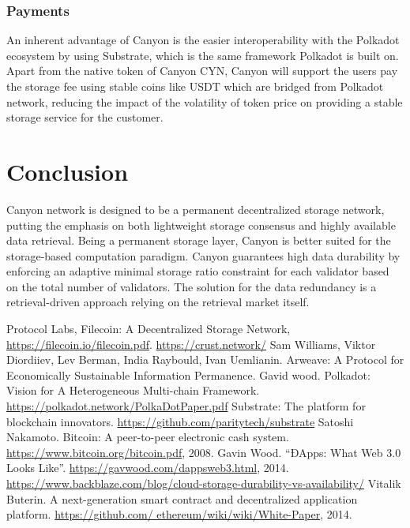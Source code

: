 \documentclass[]{article}
\begin{document}
\subsubsection{Payments}

An inherent advantage of Canyon is the easier interoperability with the Polkadot\cite{polkadot} ecosystem by using Substrate\cite{substrate}, which is the same framework Polkadot is built on. Apart from the native token of Canyon CYN, Canyon will support the users pay the storage fee using stable coins like USDT which are bridged from Polkadot network, reducing the impact of the volatility of token price on providing a stable storage service for the customer.

\section{Conclusion}

Canyon network is designed to be a permanent decentralized storage network, putting the emphasis on both lightweight storage consensus and highly available data retrieval. Being a permanent storage layer, Canyon is better suited for the storage-based computation paradigm. Canyon guarantees high data durability by enforcing an adaptive minimal storage ratio constraint for each validator based on the total number of validators. The solution for the data redundancy is a retrieval-driven approach relying on the retrieval market itself.

\begin{thebibliography}{99}
Protocol Labs, Filecoin: A Decentralized Storage Network, \url{https://filecoin.io/filecoin.pdf}.
\url{https://crust.network/}
Sam Williams, Viktor Diordiiev, Lev Berman, India Raybould, Ivan Uemlianin. Arweave: A Protocol for Economically Sustainable Information Permanence.
Gavid wood. Polkadot: Vision for A Heterogeneous Multi-chain Framework. \url{https://polkadot.network/PolkaDotPaper.pdf}
Substrate: The platform for blockchain innovators. \url{https://github.com/paritytech/substrate}
Satoshi Nakamoto. Bitcoin: A peer-to-peer electronic cash system. \url{https://www.bitcoin.org/bitcoin.pdf}, 2008.
Gavin Wood. “ĐApps: What Web 3.0 Looks Like”. \url{https://gavwood.com/dappsweb3.html}, 2014.
\url{https://www.backblaze.com/blog/cloud-storage-durability-vs-availability/}
Vitalik Buterin. A next-generation smart contract and decentralized application platform. \url{https://github.com/
ethereum/wiki/wiki/White-Paper}, 2014.
\end{thebibliography}
\end{document}
